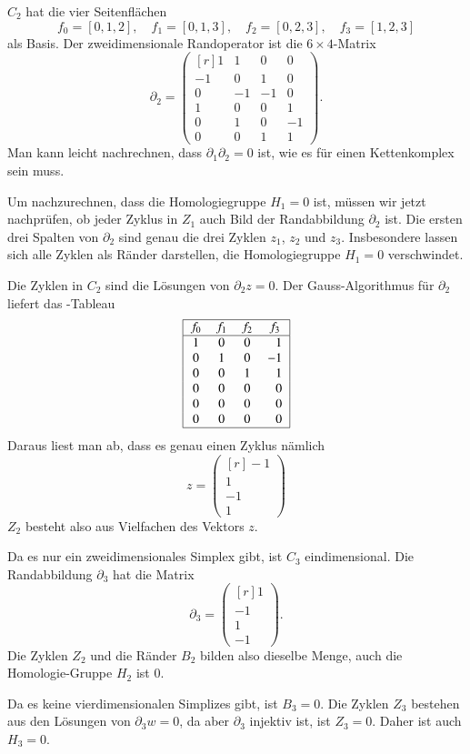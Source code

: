 \begin{beispiel}
$C_2$ hat die vier Seitenflächen
\[
f_0=[0,1,2],\quad
f_1=[0,1,3],\quad
f_2=[0,2,3],\quad
f_3=[1,2,3]
\]
als Basis.
Der zweidimensionale Randoperator ist die $6\times 4$-Matrix 
\[
\partial_2
=
\begin{pmatrix*}[r]
 1& 1& 0& 0\\
-1& 0& 1& 0\\
 0&-1&-1& 0\\
 1& 0& 0& 1\\
 0& 1& 0&-1\\
 0& 0& 1& 1
\end{pmatrix*}.
\]
Man kann leicht nachrechnen, dass $\partial_1\partial_2=0$ ist, wie es
für einen Kettenkomplex sein muss.

Um nachzurechnen, dass die Homologiegruppe $H_1=0$ ist, müssen wir jetzt 
nachprüfen, ob jeder Zyklus in $Z_1$ auch Bild der Randabbildung $\partial_2$
ist.
Die ersten drei Spalten von $\partial_2$ sind genau die drei Zyklen
$z_1$, $z_2$ und $z_3$.
Insbesondere lassen sich alle Zyklen als Ränder darstellen, die
Homologiegruppe $H_1=0$ verschwindet.

Die Zyklen in $C_2$ sind die Lösungen von $\partial_2z=0$.
Der Gauss-Algorithmus für $\partial_2$ liefert das -Tableau
\[
\begin{tabular}{|>{$}c<{$}>{$}c<{$}>{$}c<{$}>{$}c<{$}|}
\hline
f_0&f_1&f_2&f_3\\
\hline
1&0&0& \phantom{-}1\\
0&1&0&-1\\
0&0&1& \phantom{-}1\\
0&0&0& \phantom{-}0\\
0&0&0& \phantom{-}0\\
0&0&0& \phantom{-}0\\
\hline
\end{tabular}
\]
Daraus liest man ab, dass es genau einen Zyklus nämlich
\[
z
=
\begin{pmatrix*}[r]
-1\\1\\-1\\1
\end{pmatrix*}
\]
$Z_2$ besteht also aus Vielfachen des Vektors $z$.

Da es nur ein zweidimensionales Simplex gibt, ist $C_3$ eindimensional.
Die Randabbildung $\partial_3$ hat die Matrix
\[
\partial_3
=
\begin{pmatrix*}[r]
1\\
-1\\
1\\
-1
\end{pmatrix*}.
\]
Die Zyklen $Z_2$ und die Ränder $B_2$ bilden also dieselbe Menge, auch
die Homologie-Gruppe $H_2$ ist $0$.

Da es keine vierdimensionalen Simplizes gibt, ist $B_3=0$.
Die Zyklen $Z_3$ bestehen aus den Lösungen von $\partial_3w=0$, da
aber $\partial_3$ injektiv ist, ist $Z_3=0$.
Daher ist auch $H_3=0$.
\end{beispiel}

